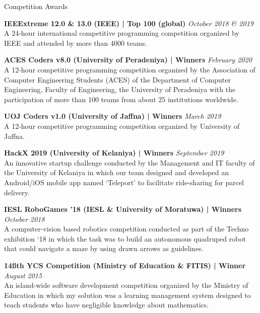 \documentclass{cv}
\begin{document}

\begin{rSection}{Competition Awards}{
        {\bf IEEExtreme 12.0 \& 13.0 (IEEE) | Top 100 (global)}                         \hfill {\em October 2018 \& 2019}
        \\A 24-hour international competitive programming competition organized by IEEE and attended by more than 4000 teams.\par

        {\bf ACES Coders v8.0 (University of Peradeniya) | Winners}                     \hfill {\em February 2020}
        \\A 12-hour competitive programming competition organized by the Association of Computer Engineering Students (ACES) of the Department of Computer Engineering, Faculty of Engineering, the University of Peradeniya with the participation of more than 100 teams from about 25 institutions worldwide.\par

        {\bf UOJ Coders v1.0 (University of Jaffna) | Winners}                          \hfill {\em March 2019}
        \\A 12-hour competitive programming competition organized by University of Jaffna.\par

        {\bf HackX 2019 (University of Kelaniya) | Winners}                             \hfill {\em September 2019}
        \\An innovative startup challenge conducted by the Management and IT faculty of the University of Kelaniya in which our team designed and developed an Android/iOS mobile app named `Teleport' to facilitate ride-sharing for parcel delivery.\par

        {\bf IESL RoboGames '18 (IESL \& University of Moratuwa) | Winners}             \hfill {\em October 2018}
        \\A computer-vision based robotics competition conducted as part of the Techno exhibition `18 in which the task was to build an autonomous quadruped robot that could navigate a maze by using drawn arrows as guidelines.\par

        {\bf 14\ss{th} YCS Competition (Ministry of Education \& FITIS) | Winner}       \hfill {\em August 2015}
        \\An island-wide software development competition organized by the Ministry of Education in which my solution was a learning management system designed to teach students who have negligible knowledge about mathematics.\par

}
\end{rSection}
\end{document}
